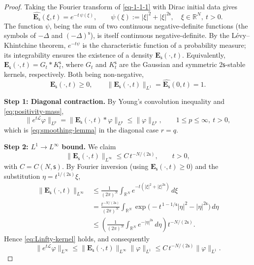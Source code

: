 \documentclass[10pt,a4paper]{amsart}
\newcommand{\ts}{\mathsf{s}}
\begin{document}
\begin{proof}
Taking the Fourier transform of \eqref{eq-1-1-1} with Dirac initial data gives
\begin{equation}\label{eq:fourier-kernel}
\widehat{\mathbf{E}_{\ts}}(\xi,t)=e^{-t\,\psi(\xi)},\qquad
\psi(\xi):=|\xi|^{2}+|\xi|^{2\ts},\quad \xi\in\mathbb{R}^{N},\ t>0.
\end{equation}
The function $\psi$, being the sum of two continuous negative-definite functions (the symbols of $-\Delta$ and $(-\Delta)^{\ts}$), is itself continuous negative-definite. By the L\'evy--Khintchine theorem, $e^{-t\psi}$ is the characteristic function of a probability measure; its integrability ensures the existence of a density $\mathbf{E}_{\ts}(\cdot,t)$. Equivalently, $\mathbf{E}_{\ts}(\cdot,t)=G_{t}\ast K_{t}^{\ts}$, where $G_{t}$ and $K_{t}^{\ts}$ are the Gaussian and symmetric $2\ts$-stable kernels, respectively. Both being non-negative,
\begin{equation}\label{eq:positivity-mass}
\mathbf{E}_{\ts}(\cdot,t)\geq 0,\qquad
\|\mathbf{E}_{\ts}(\cdot,t)\|_{L^{1}}=\widehat{\mathbf{E}_{\ts}}(0,t)=1.
\end{equation}

\medskip
\noindent\textbf{Step 1: Diagonal contraction.}
By Young's convolution inequality and \eqref{eq:positivity-mass},
\begin{equation}\label{eq:contraction}
\|e^{t\mathscr{L}}\varphi\|_{L^{p}}
=\|\mathbf{E}_{\ts}(\cdot,t)\ast\varphi\|_{L^{p}}
\leq\|\varphi\|_{L^{p}},
\qquad 1\leq p\leq\infty,\ t>0,
\end{equation}
which is \eqref{eq:smoothing-lemma} in the diagonal case $r=q$.

\medskip
\noindent\textbf{Step 2: $L^{1}\!\to\!L^{\infty}$ bound.}
We claim
\begin{equation}\label{eq:Linfty-kernel}
\|\mathbf{E}_{\ts}(\cdot,t)\|_{L^{\infty}}\leq C\,t^{-N/(2\ts)},\qquad t>0,
\end{equation}
with $C=C(N,\ts)$. By Fourier inversion (using $\mathbf{E}_{\ts}(\cdot,t)\geq 0$) and the substitution $\eta=t^{1/(2\ts)}\xi$,
\begin{equation}\label{eq:rescale}
\begin{split}
\|\mathbf{E}_{\ts}(\cdot,t)\|_{L^{\infty}}
&\leq\frac{1}{(2\pi)^{N}}\int_{\mathbb{R}^{N}}e^{-t(|\xi|^{2}+|\xi|^{2\ts})}\,d\xi \\
&=\frac{t^{-N/(2\ts)}}{(2\pi)^{N}}\int_{\mathbb{R}^{N}}\exp\!\bigl(-t^{\,1-1/\ts}|\eta|^{2}-|\eta|^{2\ts}\bigr)\,d\eta \\
&\leq \left(\frac{1}{(2\pi)^{N}}\int_{\mathbb{R}^{N}}e^{-|\eta|^{2\ts}}\,d\eta\right)t^{-N/(2\ts)}.
\end{split}
\end{equation}
Hence \eqref{eq:Linfty-kernel} holds, and consequently
\begin{equation}\label{eq:L1Linfty}
\|e^{t\mathscr{L}}\varphi\|_{L^{\infty}}
\leq\|\mathbf{E}_{\ts}(\cdot,t)\|_{L^{\infty}}\|\varphi\|_{L^{1}}
\leq C\,t^{-N/(2\ts)}\|\varphi\|_{L^{1}}.
\end{equation}


\end{proof}
\end{document}
